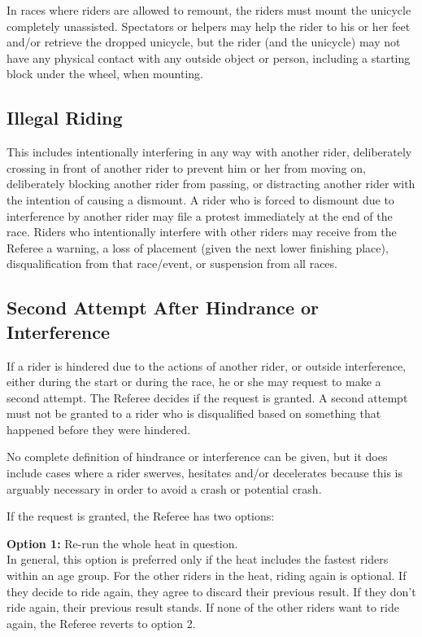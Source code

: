 In races where riders are allowed to remount, the riders must mount the unicycle completely unassisted.
Spectators or helpers may help the rider to his or her feet and/or retrieve the dropped unicycle, but the rider (and the unicycle) may not have any physical contact with any outside object or person, including a starting block under the wheel, when mounting.

\subsection{Illegal Riding}

This includes intentionally interfering in any way with another rider, deliberately crossing in front of another rider to prevent him or her from moving on, deliberately blocking another rider from passing, or distracting another rider with the intention of causing a dismount.
A rider who is forced to dismount due to interference by another rider may file a protest immediately at the end of the race.
Riders who intentionally interfere with other riders may receive from the Referee a warning, a loss of placement (given the next lower finishing place), disqualification from that race/event, or suspension from all races.

\subsection{Second Attempt After Hindrance or Interference}

If a rider is hindered due to the actions of another rider, or outside interference, either during the start or during the race, he or she may request to make a second attempt.
The Referee decides if the request is granted.
A second attempt must not be granted to a rider who is disqualified based on something that happened before they were hindered.

No complete definition of hindrance or interference can be given, but it does include cases where a rider swerves, hesitates and/or decelerates because this is arguably necessary in order to avoid a crash or potential crash.

If the request is granted, the Referee has two options:

\textbf{Option 1:}
Re-run the whole heat in question.\\
In general, this option is preferred only if the heat includes the fastest riders within an age group.
For the other riders in the heat, riding again is optional.
If they decide to ride again, they agree to discard their previous result.
If they don't ride again, their previous result stands.
If none of the other riders want to ride again, the Referee reverts to option 2.

